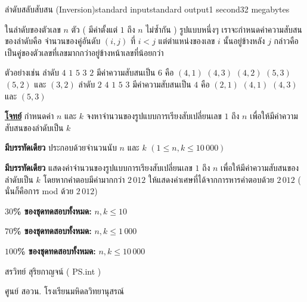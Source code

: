\documentclass[11pt,a4paper]{article}
\begin{document}
\begin{problem}{ลำดับสลับสับสน (Inversion)}{standard input}{standard output}{1 second}{32 megabytes}

    ในลำดับของตัวเลข $n$ ตัว ( มีค่าตั้งแต่ $1$ ถึง $n$ ไม่ซ้ำกัน ) รูปแบบหนึ่งๆ เราจะกำหนดค่าความสับสนของลำดับคือ จำนวนของคู่อันดับ      $( i , j )$ ที่ $i < j$ แต่ตำแหน่งของเลข $i$ นั้นอยู่ข้างหลัง $j$ กล่าวคือเป็นคู่ของตัวเลขที่เลขมากกว่าอยู่ข้างหน้าเลขที่น้อยกว่า

                        ตัวอย่างเช่น          ลำดับ $4$ $1$ $5$ $3$ $2$ มีค่าความสับสนเป็น $6$ คือ $(4,1)$ $(4,3)$ $(4,2)$ $(5,3)$ $(5,2)$ และ $(3,2)$
                                                ลำดับ $2$ $4$ $1$ $5$ $3$ มีค่าความสับสนเป็น $4$ คือ $(2,1)$ $(4,1)$ $(4,3)$ และ $(5,3)$

            

\bigskip
\underline{\textbf{โจทย์}}  กำหนดค่า $n$ และ $k$ จงหาจำนวนของรูปแบบการเรียงสับเปลี่ยนเลข $1$ ถึง $n$ เพื่อให้มีค่าความสับสนของลำดับเป็น $k$


\InputFile

\textbf{มีบรรทัดเดียว} ประกอบด้วยจำนวนนับ $n$ และ $k$ $( 1 \leq n , k \leq 10\,000 )$


\OutputFile

\textbf{มีบรรทัดเดียว} แสดงค่าจำนวนของรูปแบบการเรียงสับเปลี่ยนเลข $1$ ถึง $n$ เพื่อให้มีค่าความสับสนของลำดับเป็น $k$ โดยหากคำตอบมีค่ามากกว่า $2\,012$ ให้แสดงค่าเศษที่ได้จากการหารคำตอบด้วย $2\,012$ ( นั่นก็คือการ mod ด้วย $2\,012$)


\Examples

\begin{example}
%
%
\end{example}

\Scoring

 \textbf{$30$\% ของชุดทดสอบทั้งหมด:} $n, k \leq 10$
 
            \textbf{$70$\% ของชุดทดสอบทั้งหมด:} $n, k \leq 1\,000$
            
           \textbf{ $100$\% ของชุดทดสอบทั้งหมด:} $n, k \leq 10\,000$
            
\Source

สรวิทย์  สุริยกาญจน์ ( PS.int )

ศูนย์ สอวน. โรงเรียนมหิดลวิทยานุสรณ์

\end{problem}
\end{document}
